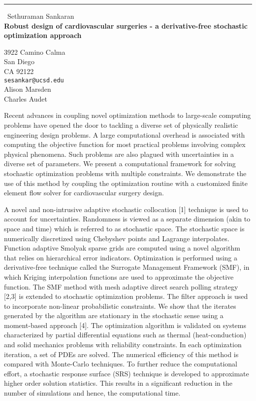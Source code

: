 \documentclass{report}
\begin{document}
\begin{center}
\rule{6in}{1pt} \
{\large Sethuraman Sankaran \\
{\bf Robust design of cardiovascular surgeries - a derivative-free stochastic optimization approach}}

3922 Camino Calma \\ San Diego \\ CA 92122
\\
{\tt sesankar@ucsd.edu}\\
Alison Marsden\\
Charles Audet\end{center}

Recent advances in coupling novel optimization methods to large-scale
computing problems have opened the door to tackling a diverse set of
physically realistic engineering design problems. A large computational
overhead is associated with computing the objective function for most
practical problems involving complex physical phenomena. Such problems
are also plagued with uncertainties in a diverse set of parameters. We
present a computational framework for solving stochastic optimization
problems with multiple constraints. We demonstrate the use of this method
by coupling the optimization routine with a customized finite element
flow solver for cardiovascular surgery design.

A novel and non-intrusive adaptive stochastic collocation [1] technique
is used to account for uncertainties. Randomness is viewed as a separate
dimension (akin to space and time) which is referred to as stochastic
space. The stochastic space is numerically discretized using Chebyshev
points and Lagrange interpolates. Function adaptive Smolyak sparse grids
are computed using a novel algorithm that relies on hierarchical error
indicators. Optimization is performed using a derivative-free technique
called the Surrogate Management Framework (SMF), in which Kriging
interpolation functions are used to approximate the objective function.
The SMF method with mesh adaptive direct search polling strategy [2,3] is
extended to stochastic optimization problems. The filter approach is used
to incorporate non-linear probabilistic constraints. We show that the
iterates generated by the algorithm are stationary in the stochastic
sense using a moment-based approach [4]. The optimization algorithm is
validated on systems characterized by partial differential equations such
as thermal (heat-conduction) and solid mechanics problems with
reliability constraints. In each optimization iteration, a set of PDEs
are solved. The numerical efficiency of this method is compared with
Monte-Carlo techniques. To further reduce the computational effort, a
stochastic response surface (SRS) technique is developed to approximate
higher order solution statistics. This results in a significant reduction
in the number of simulations and hence, the computational time.
\end{document}
